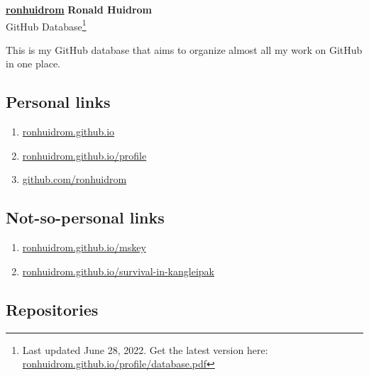 \documentclass{article}
\begin{document}

\begin{center}
  \Large  \href{https://github.com/ronhuidrom}{\textbf{ronhuidrom}} \hspace*{8pt}\textbf{Ronald Huidrom}\\
  \vspace*{1mm}
  \large GitHub Database\footnote{Last updated June 28, 2022. Get the latest version here: \href{https://}{ronhuidrom.github.io/profile/database.pdf}}
\end{center}


\normalsize
This is my GitHub database that aims to organize almost all my work on GitHub in one place.

\subsection*{Personal links}


\begin{enumerate}
\item \href{https://ronhuidrom.github.io}{ronhuidrom.github.io} 
\item \href{https://ronhuidrom.github.io/profile}{ronhuidrom.github.io/profile} 
\item \href{https://github.com/ronhuidrom}{github.com/ronhuidrom}
\end{enumerate}

\subsection*{Not-so-personal links}

\begin{enumerate}[resume]
\item \href{https://ronhuidrom.github.io/mskey}{ronhuidrom.github.io/mskey} 
\item \href{https://ronhuidrom.github.io/survival-in-kangleipak}{ronhuidrom.github.io/survival-in-kangleipak}
\end{enumerate}

\subsection*{Repositories}
\end{document}
